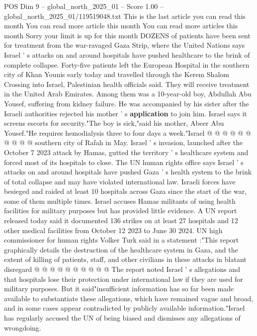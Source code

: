 \begin{textsample}{POS Dim 9 – global\_north\_2025\_01 – Score 1.00 – global\_north\_2025\_01/119519048.txt}  \label{ex:f9_pos_419}
This is the last article you can read this month You can read more article this month You can read more articles this month Sorry your limit is up for this month DOZENS of patients have been sent for treatment from the war-ravaged Gaza Strip, where the United Nations says Israel ' s attacks on and around hospitals have pushed healthcare to the brink of complete collapse.
Forty-five patients left the European Hospital in the southern city of Khan Younis early today and travelled through the Kerem Shalom Crossing into Israel, Palestinian health officials said.
They will receive treatment in the United Arab Emirates.
Among them was a 10-year-old boy, Abdullah Abu Yousef, suffering from kidney failure.
He was accompanied by his sister after the Israeli authorities rejected his mother ' s \textbf{application} to join him.
Israel says it screens escorts for security."The boy is sick,"said his mother, Abeer Abu Yousef."He requires hemodialysis three to four days a week."Israel @ @ @ @ @ @ @ @ @ @ southern city of Rafah in May.
Israel ' s invasion, launched after the October 7 2023 attack by Hamas, gutted the territory ' s healthcare system and forced most of its hospitals to close.
The UN human rights office says Israel ' s attacks on and around hospitals have pushed Gaza ' s health system to the brink of total collapse and may have violated international law.
Israeli forces have besieged and raided at least 10 hospitals across Gaza since the start of the war, some of them multiple times.
Israel accuses Hamas militants of using health facilities for military purposes but has provided little evidence.
A UN report released today said it documented 136 strikes on at least 27 hospitals and 12 other medical facilities from October 12 2023 to June 30 2024.
UN high commissioner for human rights Volker Turk said in a statement :"This report graphically details the destruction of the healthcare system in Gaza, and the extent of killing of patients, staff, and other civilians in these attacks in blatant disregard @ @ @ @ @ @ @ @ @ @ The report noted Israel ' s allegations and that hospitals lose their protection under international law if they are used for military purposes.
But it said"insufficient information has so far been made available to substantiate these allegations, which have remained vague and broad, and in some cases appear contradicted by publicly available information."Israel has regularly accused the UN of being biased and dismisses any allegations of wrongdoing.

\end{textsample}
